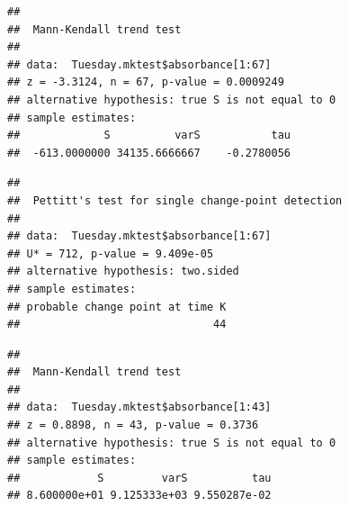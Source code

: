 \documentclass[12pt,]{article}
\newenvironment{Shaded}{\begin{snugshade}}{\end{snugshade}}
\newcommand{\KeywordTok}[1]{\textcolor[rgb]{0.13,0.29,0.53}{\textbf{#1}}}
\newcommand{\DecValTok}[1]{\textcolor[rgb]{0.00,0.00,0.81}{#1}}
\newcommand{\CommentTok}[1]{\textcolor[rgb]{0.56,0.35,0.01}{\textit{#1}}}
\newcommand{\OperatorTok}[1]{\textcolor[rgb]{0.81,0.36,0.00}{\textbf{#1}}}
\newcommand{\NormalTok}[1]{#1}
\begin{document}
\begin{verbatim}
## 
##  Mann-Kendall trend test
## 
## data:  Tuesday.mktest$absorbance[1:67]
## z = -3.3124, n = 67, p-value = 0.0009249
## alternative hypothesis: true S is not equal to 0
## sample estimates:
##             S          varS           tau 
##  -613.0000000 34135.6666667    -0.2780056
\end{verbatim}

\begin{Shaded}
\end{Shaded}

\begin{verbatim}
## 
##  Pettitt's test for single change-point detection
## 
## data:  Tuesday.mktest$absorbance[1:67]
## U* = 712, p-value = 9.409e-05
## alternative hypothesis: two.sided
## sample estimates:
## probable change point at time K 
##                              44
\end{verbatim}

\begin{Shaded}
\end{Shaded}

\begin{verbatim}
## 
##  Mann-Kendall trend test
## 
## data:  Tuesday.mktest$absorbance[1:43]
## z = 0.8898, n = 43, p-value = 0.3736
## alternative hypothesis: true S is not equal to 0
## sample estimates:
##            S         varS          tau 
## 8.600000e+01 9.125333e+03 9.550287e-02
\end{verbatim}

\begin{Shaded}
\end{Shaded}
\end{document}
